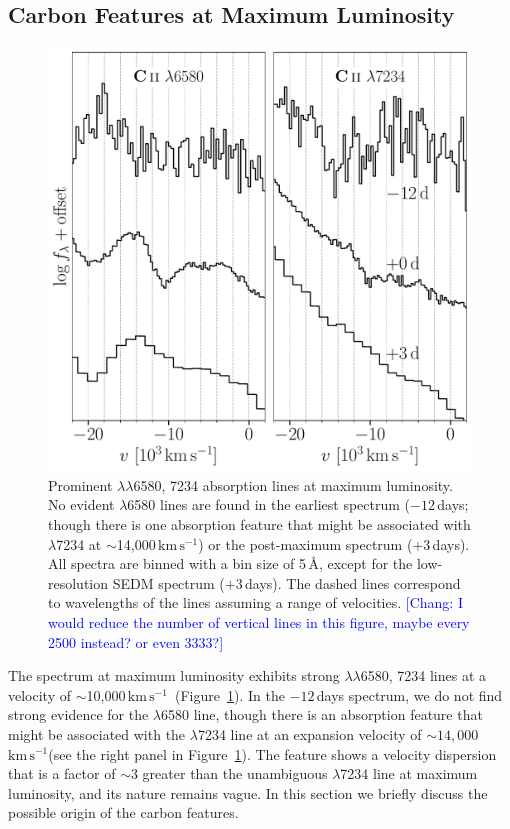\documentclass[twocolumn]{aastex631}
\newcommand{\sn}{SN\,2022joj}
\newcommand{\kms}{$\mathrm{km}\,\mathrm{s}^{-1}$}
\newcommand{\chang}[1]{\textcolor{blue}{[Chang: #1]}}
\begin{document}
\begin{CJK*}{UTF8}{gbsn}
\subsection{Carbon Features at Maximum Luminosity}\label{sec:disc_C_II}
\begin{figure}
    \centering
    \includegraphics[width=\linewidth]{C_II.pdf}
    \caption{Prominent  $\lambda\lambda$6580, 7234 absorption lines at maximum luminosity. No evident  $\lambda$6580 lines are found in the earliest spectrum ($-12$\,days; though there is one absorption feature that might be associated with  $\lambda$7234 at $\sim$14,000\,\kms) or the post-maximum spectrum ($+3$\,days). All spectra are binned with a bin size of 5\,\AA, except for the low-resolution SEDM spectrum ($+3$\,days). The dashed lines correspond to wavelengths of the  lines assuming a range of velocities. \chang{I would reduce the number of vertical lines in this figure, maybe every 2500 instead? or even 3333?}}
    \label{fig:C_II}
\end{figure}
The spectrum at maximum luminosity exhibits strong  $\lambda\lambda$6580, 7234 lines at a velocity of $\sim$10,000\,\kms\  (Figure~\ref{fig:C_II}). In the $-12$\,days spectrum, we do not find strong evidence for the  $\lambda$6580 line, though there is an absorption feature that might be associated with the  $\lambda$7234 line at an expansion velocity of $\sim$$14,000$\,\kms (see the right panel in Figure~\ref{fig:C_II}). The feature shows a velocity dispersion that is a factor of $\sim$3 greater than the unambiguous  $\lambda$7234 line at maximum luminosity, and its nature remains vague. %
In this section we briefly discuss the possible origin of the carbon features.


\end{CJK*}
\end{document}

